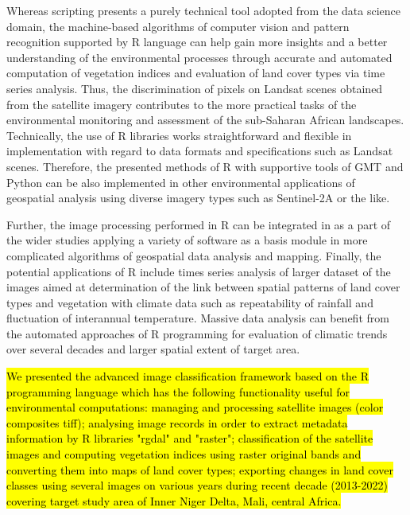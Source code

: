 \documentclass[12pt,a4paper,oneside]{article}
\def \newpar{\vspace{6pt}}
\begin{document}
\newpar Whereas scripting presents a purely technical tool adopted from the data science domain, the machine-based algorithms of computer vision and pattern recognition supported by R language can help gain more insights and a better understanding of the environmental processes through accurate and automated computation of vegetation indices and evaluation of land cover types via time series analysis. Thus, the discrimination of pixels on Landsat scenes obtained from the satellite imagery contributes to the more practical tasks of the environmental monitoring and assessment of the sub-Saharan African landscapes. Technically, the use of R libraries works straightforward and flexible in implementation with regard to data formats and specifications such as Landsat scenes. Therefore, the presented methods of R with supportive tools of GMT and Python can be also implemented in other environmental applications of geospatial analysis using diverse imagery types such as Sentinel-2A or the like. 

\newpar Further, the image processing performed in R can be integrated in as a part of the wider studies applying a variety of software as a basis module in more complicated algorithms of geospatial data analysis and mapping. Finally, the potential applications of R include times series analysis of larger dataset of the images aimed at determination of the link between spatial patterns of land cover types and vegetation with climate data such as repeatability of rainfall and fluctuation of interannual temperature. Massive data analysis can benefit from the automated approaches of R programming for evaluation of climatic trends over several decades and larger spatial extent of target area.

\newpar \hl{We presented the advanced image classification framework based on the R programming language which has the following functionality useful for environmental computations: managing and processing satellite images (color composites tiff); analysing image records in order to extract metadata information by R libraries "rgdal" and "raster"; classification of the satellite images and computing vegetation indices using raster original bands  and converting them into maps of land cover types; exporting changes in land cover classes using several images on various years during recent decade (2013-2022) covering target study area of Inner Niger Delta, Mali, central Africa.}

\vspace{12pt}
\end{document}
